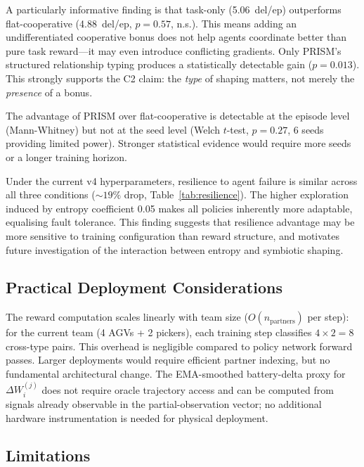 \documentclass[Afour,sageh,times]{sagej}
\begin{document}
A particularly informative finding is that task-only (5.06~del/ep) outperforms flat-cooperative (4.88~del/ep, $p{=}0.57$, n.s.). This means adding an undifferentiated cooperative bonus does not help agents coordinate better than pure task reward---it may even introduce conflicting gradients. Only PRISM's structured relationship typing produces a statistically detectable gain ($p{=}0.013$). This strongly supports the C2 claim: the \emph{type} of shaping matters, not merely the \emph{presence} of a bonus.

The advantage of PRISM over flat-cooperative is detectable at the episode level (Mann-Whitney) but not at the seed level (Welch $t$-test, $p{=}0.27$, 6 seeds providing limited power). Stronger statistical evidence would require more seeds or a longer training horizon.

Under the current v4 hyperparameters, resilience to agent failure is similar across all three conditions (${\sim}19\%$ drop, Table~\ref{tab:resilience}). The higher exploration induced by entropy coefficient 0.05 makes all policies inherently more adaptable, equalising fault tolerance. This finding suggests that resilience advantage may be more sensitive to training configuration than reward structure, and motivates future investigation of the interaction between entropy and symbiotic shaping.

\subsection{Practical Deployment Considerations}

The reward computation scales linearly with team size ($O(n_{\mathrm{partners}})$ per step): for the current team (4 AGVs + 2 pickers), each training step classifies $4 \times 2 = 8$ cross-type pairs. This overhead is negligible compared to policy network forward passes. Larger deployments would require efficient partner indexing, but no fundamental architectural change. The EMA-smoothed battery-delta proxy for $\Delta W_i^{(j)}$ does not require oracle trajectory access and can be computed from signals already observable in the partial-observation vector; no additional hardware instrumentation is needed for physical deployment.

\subsection{Limitations}
\end{document}
